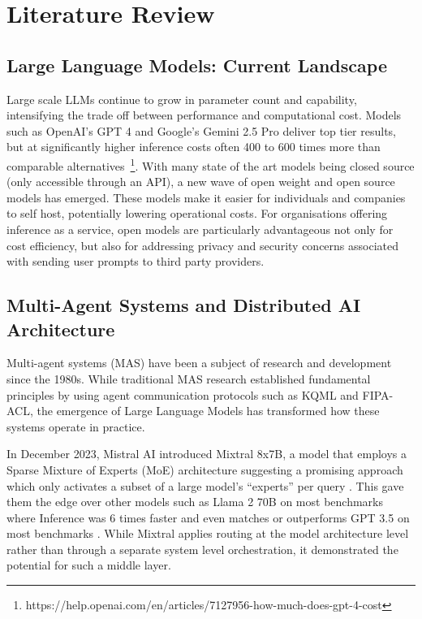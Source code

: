 \chapter{Literature Review}
\label{ch:lit_rev} %

\section{Large Language Models: Current Landscape}
Large scale LLMs continue to grow in parameter count and capability, intensifying the trade off between performance and computational cost. Models such as OpenAI's GPT 4 and Google's Gemini 2.5 Pro deliver top tier results, but at significantly higher inference costs often 400 to 600 times more than comparable alternatives~\footnote{https://help.openai.com/en/articles/7127956-how-much-does-gpt-4-cost}. With many state of the art models being closed source (only accessible through an API), a new wave of open weight and open source models has emerged. These models make it easier for individuals and companies to self host, potentially lowering operational costs. For organisations offering inference as a service, open models are particularly advantageous not only for cost efficiency, but also for addressing privacy and security concerns associated with sending user prompts to third party providers.

\section{Multi-Agent Systems and Distributed AI Architecture}
Multi-agent systems (MAS) have been a subject of research and development since the 1980s. While traditional MAS research established fundamental principles by using agent communication protocols such as KQML and FIPA-ACL, the emergence of Large Language Models has transformed how these systems operate in practice.

In December 2023, Mistral AI introduced Mixtral 8x7B, a model that employs a Sparse Mixture of Experts (MoE) architecture suggesting a promising approach which only activates a subset of a large model's ``experts'' per query \citep{fu2025moecapbenchmarkingcostaccuracy}. This gave them the edge over other models such as Llama 2 70B on most benchmarks where Inference was 6 times faster and even matches or outperforms GPT 3.5 on most benchmarks \citep{hu2024routerbenchbenchmarkmultillmrouting}. While Mixtral applies routing at the model architecture level rather than through a separate system level orchestration, it demonstrated the potential for such a middle layer.

